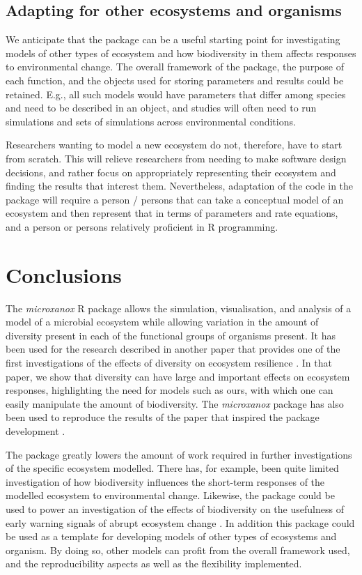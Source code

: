 \documentclass[]{elsarticle} %
\begin{document}
\subsection{Adapting for other ecosystems and organisms}\label{adapting-for-other-ecosystems-and-organisms}

We anticipate that the package can be a useful starting point for investigating models of other types of ecosystem and how biodiversity in them affects responses to environmental change. The overall framework of the package, the purpose of each function, and the objects used for storing parameters and results could be retained. E.g., all such models would have parameters that differ among species and need to be described in an object, and studies will often need to run simulations and sets of simulations across environmental conditions.

Researchers wanting to model a new ecosystem do not, therefore, have to start from scratch. This will relieve researchers from needing to make software design decisions, and rather focus on appropriately representing their ecosystem and finding the results that interest them. Nevertheless, adaptation of the code in the package will require a person / persons that can take a conceptual model of an ecosystem and then represent that in terms of parameters and rate equations, and a person or persons relatively proficient in R programming.

\section{Conclusions}\label{conclusions}

The \emph{microxanox} R package allows the simulation, visualisation, and analysis of a model of a microbial ecosystem while allowing variation in the amount of diversity present in each of the functional groups of organisms present. It has been used for the research described in another paper that provides one of the first investigations of the effects of diversity on ecosystem resilience \citet{Limberger2023}. In that paper, we show that diversity can have large and important effects on ecosystem responses, highlighting the need for models such as ours, with which one can easily manipulate the amount of biodiversity. The \emph{microxanox} package has also been used to reproduce the results of the paper that inspired the package development \citep{Bush2017}.

The package greatly lowers the amount of work required in further investigations of the specific ecosystem modelled. There has, for example, been quite limited investigation of how biodiversity influences the short-term responses of the modelled ecosystem to environmental change. Likewise, the package could be used to power an investigation of the effects of biodiversity on the usefulness of early warning signals of abrupt ecosystem change \citep{Scheffer2009}. In addition this package could be used as a template for developing models of other types of ecosystems and organism. By doing so, other models can profit from the overall framework used, and the reproducibility aspects as well as the flexibility implemented.
\end{document}
